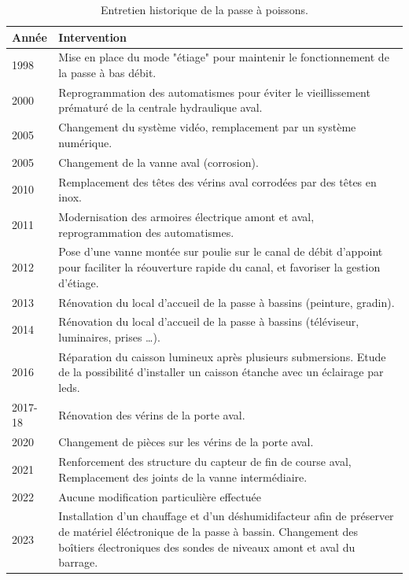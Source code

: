 \documentclass[11pt,twocolumn,titlepage,twoside]{article}\usepackage[]{graphicx}\usepackage[]{color}
\begin{document}
\begin{table}[htb]
\begin{tabular}{p{}p{}}
\toprule
Année & Intervention\\
\midrule
1998 & Mise en place du mode "étiage" pour maintenir le fonctionnement
de la passe à bas débit.\\
2000 & Reprogrammation des automatismes pour éviter le vieillissement
prématuré de la centrale hydraulique aval.\\
2005 & Changement du système vidéo, remplacement par un système
numérique. \\
2005 & Changement de la vanne aval (corrosion).\\
2010 &  Remplacement des têtes des vérins aval corrodées par des têtes en
inox.\\
2011 & Modernisation des armoires électrique amont et aval,
reprogrammation des automatismes.\\
2012 & Pose d'une vanne montée sur poulie sur le canal de débit d'appoint
pour faciliter la réouverture rapide du canal, et favoriser la gestion
d'étiage.\\
2013 & Rénovation du local d'accueil de la passe à bassins (peinture,
gradin).\\
2014 & Rénovation du local d'accueil de la passe à bassins (téléviseur,
luminaires, prises \ldots{}).\\
2016 & Réparation du caisson lumineux après plusieurs submersions. Etude
de la possibilité d'installer un caisson étanche avec un éclairage par
leds.\\
2017-18 & Rénovation des vérins de la porte aval.\\
2020 & Changement de pièces sur les vérins de la porte aval.\\
2021 & Renforcement des structure du capteur de fin de course aval, Remplacement
des joints de la vanne intermédiaire.\\
2022 & Aucune modification particulière effectuée\\
2023 & Installation d'un chauffage et d'un déshumidifacteur afin de préserver de
matériel éléctronique de la passe à bassin. Changement des boîtiers
électroniques des sondes de niveaux amont et aval du barrage.\\
\bottomrule
\end{tabular}
\caption{Entretien historique de la passe à poissons.}
\label{table_entretien_passe}
\end{table}
\end{document}
